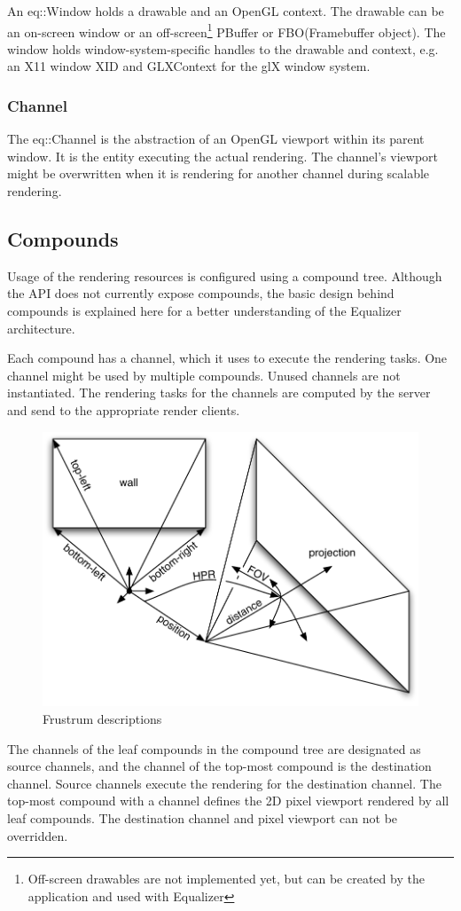 \documentclass[10pt,a4]{scrartcl}
\begin{document}
An \textsf{eq::Window} holds a drawable and an OpenGL context. The
drawable can be an on-screen window or an off-screen\footnote{Off-screen drawables are not implemented yet, but can be
  created by the application and used with Equalizer} PBuffer or
FBO(Framebuffer object). The window holds
window-system-specific handles to the drawable and context, e.g. an X11
window \textsf{XID} and \textsf{GLXContext} for the glX window system.

\subsubsection{Channel}

The \textsf{eq::Channel} is the abstraction of an OpenGL viewport within
its parent window. It is the entity executing the actual rendering. The
channel's viewport might be overwritten when it is rendering for another
channel during scalable rendering.


\subsection{Compounds}

Usage of the rendering resources is configured using a compound 
tree. Although the API does not currently expose compounds, the
basic design behind compounds is explained here for a better 
understanding of the Equalizer architecture.

Each compound has a channel, which it uses to execute the rendering
tasks. One channel might be used by multiple compounds. Unused channels
are not instantiated. The rendering tasks for the channels are computed
by the server and send to the appropriate render clients.

\begin{figure}
  \includegraphics[width=.6\textwidth]{images/frustra.pdf}
  {\caption{\small\label{fFrustra}Frustrum descriptions}}
\end{figure}
The channels of the leaf compounds in the compound tree are designated
as source channels, and the channel of the top-most compound is the
destination channel. Source channels execute the rendering for the
destination channel. The top-most compound with a channel defines the 2D
pixel viewport rendered by all leaf compounds. The destination channel
and pixel viewport can not be overridden.
\end{document}
